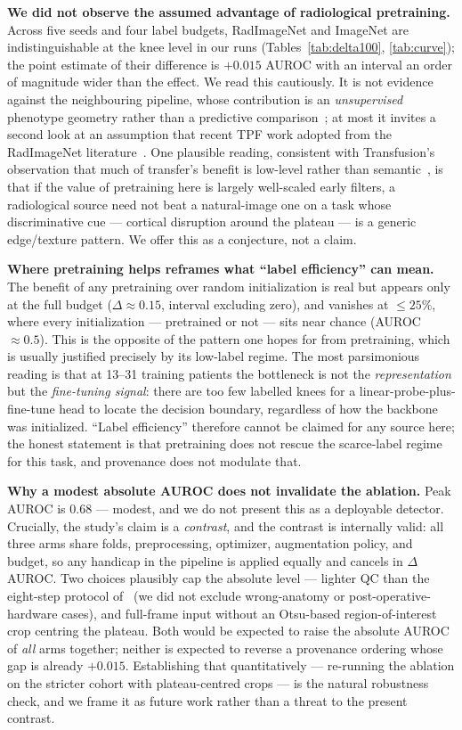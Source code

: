 \documentclass[conference]{IEEEtran}
\begin{document}
\textbf{We did not observe the assumed advantage of radiological pretraining.} Across
five seeds and four label budgets, RadImageNet and ImageNet are indistinguishable at
the knee level in our runs (Tables~\ref{tab:delta100}, \ref{tab:curve}); the point
estimate of their difference is $+0.015$ AUROC with an interval an order of magnitude
wider than the effect. We read this cautiously. It is not evidence against the
neighbouring pipeline, whose contribution is an \emph{unsupervised} phenotype geometry
rather than a predictive comparison~\cite{elnakib26}; at most it invites a second look
at an assumption that recent TPF work adopted from the RadImageNet
literature~\cite{mei22radimagenet}. One plausible reading, consistent with
Transfusion's observation that much of transfer's benefit is low-level rather than
semantic~\cite{raghu19transfusion}, is that if the value of pretraining here is
largely well-scaled early filters, a radiological source need not beat a natural-image
one on a task whose discriminative cue --- cortical disruption around the plateau ---
is a generic edge/texture pattern. We offer this as a conjecture, not a claim.

\textbf{Where pretraining helps reframes what ``label efficiency'' can mean.} The
benefit of any pretraining over random initialization is real but appears only at the
full budget ($\Delta \approx 0.15$, interval excluding zero), and vanishes at
$\le 25\%$, where every initialization --- pretrained or not --- sits near chance
(AUROC $\approx 0.5$). This is the opposite of the pattern one hopes for from
pretraining, which is usually justified precisely by its low-label regime. The most
parsimonious reading is that at 13--31 training patients the bottleneck is not the
\emph{representation} but the \emph{fine-tuning signal}: there are too few labelled
knees for a linear-probe-plus-fine-tune head to locate the decision boundary,
regardless of how the backbone was initialized. ``Label efficiency'' therefore cannot
be claimed for any source here; the honest statement is that pretraining does not
rescue the scarce-label regime for this task, and provenance does not modulate that.

\textbf{Why a modest absolute AUROC does not invalidate the ablation.} Peak AUROC is
$0.68$ --- modest, and we do not present this as a deployable detector. Crucially,
the study's claim is a \emph{contrast}, and the contrast is internally valid: all
three arms share folds, preprocessing, optimizer, augmentation policy, and budget, so
any handicap in the pipeline is applied equally and cancels in $\Delta$AUROC. Two
choices plausibly cap the absolute level --- lighter QC than the eight-step protocol
of~\cite{elnakib26} (we did not exclude wrong-anatomy or post-operative-hardware
cases), and full-frame input without an Otsu-based region-of-interest crop centring
the plateau. Both would be expected to raise the absolute AUROC of \emph{all} arms
together; neither is expected to reverse a provenance ordering whose gap is already
$+0.015$. Establishing that quantitatively --- re-running the ablation on the stricter
cohort with plateau-centred crops --- is the natural robustness check, and we frame it
as future work rather than a threat to the present contrast.
\end{document}
